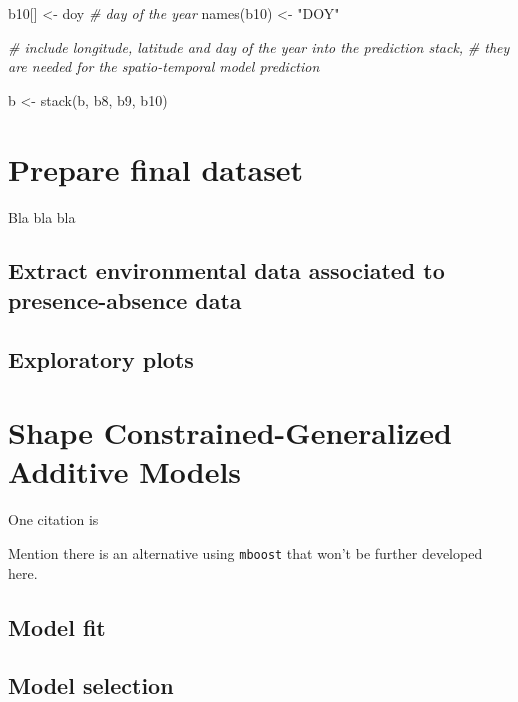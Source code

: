 \documentclass[
]{book}
\newenvironment{Shaded}{\begin{snugshade}}{\end{snugshade}}
\newcommand{\CommentTok}[1]{\textcolor[rgb]{0.56,0.35,0.01}{\textit{#1}}}
\newcommand{\FunctionTok}[1]{\textcolor[rgb]{0.00,0.00,0.00}{#1}}
\newcommand{\NormalTok}[1]{#1}
\newcommand{\OtherTok}[1]{\textcolor[rgb]{0.56,0.35,0.01}{#1}}
\newcommand{\StringTok}[1]{\textcolor[rgb]{0.31,0.60,0.02}{#1}}
\begin{document}
\begin{Shaded}
\begin{Highlighting}[]
\NormalTok{b10[] }\OtherTok{\textless{}{-}}\NormalTok{ doy }\CommentTok{\# day of the year}
\FunctionTok{names}\NormalTok{(b10) }\OtherTok{\textless{}{-}} \StringTok{"DOY"}

\CommentTok{\# include longitude, latitude and day of the year into the prediction stack, }
\CommentTok{\# they are needed for the spatio{-}temporal model prediction}

\NormalTok{b }\OtherTok{\textless{}{-}} \FunctionTok{stack}\NormalTok{(b, b8, b9, b10)}
\end{Highlighting}
\end{Shaded}

\hypertarget{prepare-final-dataset}{%
\chapter{Prepare final dataset}\label{prepare-final-dataset}}

Bla bla bla

\hypertarget{extract-environmental-data-associated-to-presence-absence-data}{%
\section{Extract environmental data associated to presence-absence data}\label{extract-environmental-data-associated-to-presence-absence-data}}

\hypertarget{exploratory-plots}{%
\section{Exploratory plots}\label{exploratory-plots}}

\hypertarget{shape-constrained-generalized-additive-models}{%
\chapter{Shape Constrained-Generalized Additive Models}\label{shape-constrained-generalized-additive-models}}

One citation is \citep{citores_etal_2020}

Mention there is an alternative using \texttt{mboost} that won't be further developed here.

\hypertarget{model-fit}{%
\section{Model fit}\label{model-fit}}

\hypertarget{model-selection}{%
\section{Model selection}\label{model-selection}}
\end{document}
